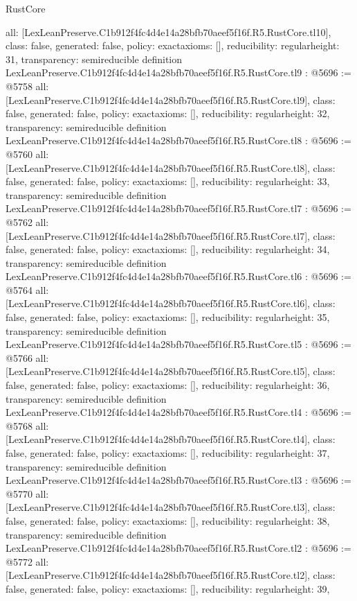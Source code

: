 \begin{lexlean}{RustCore}
\begin{coremodule}
{  all: [LexLeanPreserve.C1b912f4fc4d4e14a28bfb70aeef5f16f.R5.RustCore.tl10],
  class: false,
  generated: false,
  policy: exact{axioms: []},
  reducibility: regular{height: 31},
  transparency: semireducible
}
definition LexLeanPreserve.C1b912f4fc4d4e14a28bfb70aeef5f16f.R5.RustCore.tl9 : @5696 := @5758 {
  all: [LexLeanPreserve.C1b912f4fc4d4e14a28bfb70aeef5f16f.R5.RustCore.tl9],
  class: false,
  generated: false,
  policy: exact{axioms: []},
  reducibility: regular{height: 32},
  transparency: semireducible
}
definition LexLeanPreserve.C1b912f4fc4d4e14a28bfb70aeef5f16f.R5.RustCore.tl8 : @5696 := @5760 {
  all: [LexLeanPreserve.C1b912f4fc4d4e14a28bfb70aeef5f16f.R5.RustCore.tl8],
  class: false,
  generated: false,
  policy: exact{axioms: []},
  reducibility: regular{height: 33},
  transparency: semireducible
}
definition LexLeanPreserve.C1b912f4fc4d4e14a28bfb70aeef5f16f.R5.RustCore.tl7 : @5696 := @5762 {
  all: [LexLeanPreserve.C1b912f4fc4d4e14a28bfb70aeef5f16f.R5.RustCore.tl7],
  class: false,
  generated: false,
  policy: exact{axioms: []},
  reducibility: regular{height: 34},
  transparency: semireducible
}
definition LexLeanPreserve.C1b912f4fc4d4e14a28bfb70aeef5f16f.R5.RustCore.tl6 : @5696 := @5764 {
  all: [LexLeanPreserve.C1b912f4fc4d4e14a28bfb70aeef5f16f.R5.RustCore.tl6],
  class: false,
  generated: false,
  policy: exact{axioms: []},
  reducibility: regular{height: 35},
  transparency: semireducible
}
definition LexLeanPreserve.C1b912f4fc4d4e14a28bfb70aeef5f16f.R5.RustCore.tl5 : @5696 := @5766 {
  all: [LexLeanPreserve.C1b912f4fc4d4e14a28bfb70aeef5f16f.R5.RustCore.tl5],
  class: false,
  generated: false,
  policy: exact{axioms: []},
  reducibility: regular{height: 36},
  transparency: semireducible
}
definition LexLeanPreserve.C1b912f4fc4d4e14a28bfb70aeef5f16f.R5.RustCore.tl4 : @5696 := @5768 {
  all: [LexLeanPreserve.C1b912f4fc4d4e14a28bfb70aeef5f16f.R5.RustCore.tl4],
  class: false,
  generated: false,
  policy: exact{axioms: []},
  reducibility: regular{height: 37},
  transparency: semireducible
}
definition LexLeanPreserve.C1b912f4fc4d4e14a28bfb70aeef5f16f.R5.RustCore.tl3 : @5696 := @5770 {
  all: [LexLeanPreserve.C1b912f4fc4d4e14a28bfb70aeef5f16f.R5.RustCore.tl3],
  class: false,
  generated: false,
  policy: exact{axioms: []},
  reducibility: regular{height: 38},
  transparency: semireducible
}
definition LexLeanPreserve.C1b912f4fc4d4e14a28bfb70aeef5f16f.R5.RustCore.tl2 : @5696 := @5772 {
  all: [LexLeanPreserve.C1b912f4fc4d4e14a28bfb70aeef5f16f.R5.RustCore.tl2],
  class: false,
  generated: false,
  policy: exact{axioms: []},
  reducibility: regular{height: 39},
}
\end{coremodule}
\end{lexlean}
